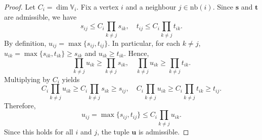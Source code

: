 \documentclass[10pt,a4paper]{amsart}
\begin{document}
\begin{proof}
Let $C_i=\dim\mathbb V_i$. Fix a vertex $i$ and a neighbour $j\in\mathrm{nb}(i)$.
Since $\mathbf s$ and $\mathbf t$ are admissible, we have
\[
s_{ij} \le C_i \prod_{k\ne j} s_{ik},
\quad
t_{ij} \le C_i \prod_{k\ne j} t_{ik}.
\]
By definition,
$ u_{ij} = \max\{s_{ij},t_{ij}\}.$
In particular, for each $k\ne j$,
$ u_{ik} = \max\{s_{ik},t_{ik}\} \ge s_{ik} $ and $u_{ik} \ge t_{ik}$.
Hence,
\[
    \prod_{k\ne j} u_{ik}
    \ge
    \prod_{k\ne j} s_{ik},
    \quad
    \prod_{k\ne j} u_{ik}
    \ge
    \prod_{k\ne j} t_{ik}.
\]
Multiplying by $C_i$ yields
\[
    C_i\prod_{k\ne j} u_{ik}
    \ge
    C_i\prod_{k\ne j} s_{ik}\ge s_{ij},
    \quad
    C_i\prod_{k\ne j} u_{ik}
    \ge
    C_i\prod_{k\ne j} t_{ik}\ge t_{ij}.
\]
Therefore,
\[
u_{ij}
=
\max\{s_{ij},t_{ij}\}
\le
C_i\prod_{k\ne j} u_{ik}.
\]
Since this holds for all $i$ and $j$, the tuple $\mathbf u$ is admissible.
\end{proof}
\end{document}
